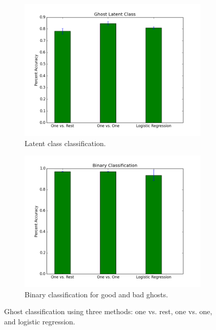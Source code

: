 \documentclass[11pt]{amsart}
\begin{document}
\begin{figure}
	\centering
	\begin{subfigure}{0.49\textwidth}
		\centering		
		\includegraphics[width=\textwidth]{ghost_latent_class.png}
		\caption{Latent class classification.}
		\label{fig:latent_class}
	\end{subfigure} %
	\begin{subfigure}{0.49\textwidth}
		\centering
		\includegraphics[width=\textwidth]{binary_classification.png}
		\caption{Binary classification for good and bad ghosts.}
		\label{fig:binary}
	\end{subfigure}
	\caption{Ghost classification using three methods: one vs. rest, one vs. one, and logistic regression.}
	\label{fig:classification}
\end{figure}
\end{document}
